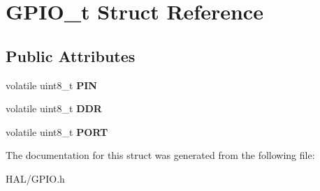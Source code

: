 \hypertarget{struct_g_p_i_o__t}{}\section{G\+P\+I\+O\+\_\+t Struct Reference}
\label{struct_g_p_i_o__t}
\subsection*{Public Attributes}
\begin{DoxyCompactItemize}
\item 
\mbox{\label{struct_g_p_i_o__t_a040314ed170d7030a433d48bc4497c8a}} 
volatile uint8\+\_\+t {\bfseries P\+IN}
\item 
\mbox{\label{struct_g_p_i_o__t_a7a183ff053ae5a4b2d8a6572287d1197}} 
volatile uint8\+\_\+t {\bfseries D\+DR}
\item 
\mbox{\label{struct_g_p_i_o__t_ab58ac97e1d10c2d564e9d038127b4b3a}} 
volatile uint8\+\_\+t {\bfseries P\+O\+RT}
\end{DoxyCompactItemize}


The documentation for this struct was generated from the following file\+:\begin{DoxyCompactItemize}
\item 
H\+A\+L/G\+P\+I\+O.\+h\end{DoxyCompactItemize}

